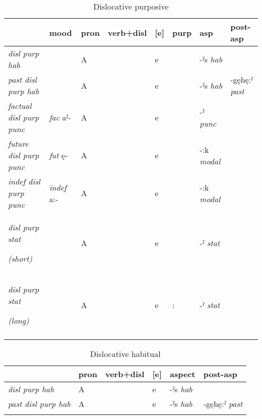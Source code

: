 \lipsum[1-1]


\begin{table}
\caption{Dislocative purposive}
\label{tab:1:dislpurp}
\scriptsize{
\begin{tabularx}{\textwidth}{XXXXXXXX}
\lsptoprule
& mood & pron & verb+disl & [e] & purp & asp & post-asp\\
\midrule
{\itshape disl purp hab}

&  & A &  & e &  & {}-ˀs \textit{hab} & \\
{\itshape past disl purp hab}

&  & A &  & e &  & {}-ˀs \textit{hab} & {}-gęhę:ˀ \textit{past}\\
{\itshape factual disl purp punc}

& \textit{fac} aˀ- & A &  & e &  & {}-ˀ \textit{punc} & \\
{\itshape future disl purp punc}

& \textit{fut} ę- & A &  & e &  & {}-:k \textit{modal} & \\
{\itshape indef disl purp punc}

& \textit{indef} a:- & A &  & e &  & {}-:k \textit{modal} & \\
{\itshape disl purp stat}

{\itshape (short)}

&  & A &  & e &  & {}-ˀ \textit{stat} & \\
{\itshape disl purp stat}

{\itshape (long)} &  & A &  & e & : & {}-ˀ \textit{stat} & \\
\lspbottomrule
\end{tabularx}}
\end{table}


\begin{table}
\caption{Dislocative habitual}
\label{tab:1:dislhab}
\scriptsize{
\begin{tabularx}{\textwidth}{XXXXXX}
\lsptoprule
& pron & verb+disl & [e] & aspect & post-asp \\
\midrule
{\itshape disl purp hab}

& A &  & e & {}-ˀs \textit{hab} & \\
{\itshape past disl purp hab}  & A &  & e & {}-ˀs \textit{hab} & {}-gęhę:ˀ \textit{past}\\
\lspbottomrule
\end{tabularx}}
\end{table}


